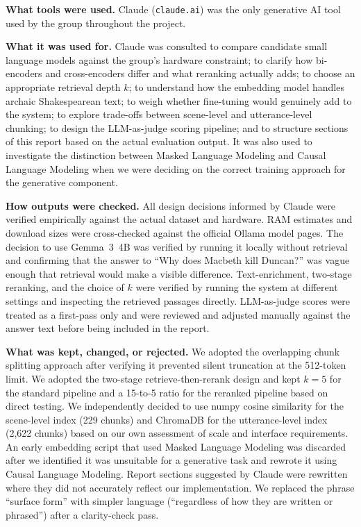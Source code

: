 \documentclass[10pt,conference]{IEEEtran}
\begin{document}
\textbf{What tools were used.} Claude (\texttt{claude.ai}) was the
only generative AI tool used by the group throughout the project.

\textbf{What it was used for.} Claude was consulted to compare
candidate small language models against the group's hardware
constraint; to clarify how bi-encoders and cross-encoders differ
and what reranking actually adds; to choose an appropriate
retrieval depth $k$; to understand how the embedding model handles
archaic Shakespearean text; to weigh whether fine-tuning would
genuinely add to the system; to explore trade-offs between
scene-level and utterance-level chunking; to design the
LLM-as-judge scoring pipeline; and to structure sections of this
report based on the actual evaluation output. It was also used to
investigate the distinction between Masked Language Modeling and
Causal Language Modeling when we were deciding on the correct
training approach for the generative component.

\textbf{How outputs were checked.} All design decisions informed by
Claude were verified empirically against the actual dataset and
hardware. RAM estimates and download sizes were cross-checked
against the official Ollama model pages. The decision to use
Gemma~3~4B was verified by running it locally without retrieval and
confirming that the answer to ``Why does Macbeth kill Duncan?'' was
vague enough that retrieval would make a visible difference.
Text-enrichment, two-stage reranking, and the choice of $k$ were
verified by running the system at different settings and inspecting
the retrieved passages directly. LLM-as-judge scores were treated
as a first-pass only and were reviewed and adjusted manually against
the answer text before being included in the report.

\textbf{What was kept, changed, or rejected.} We adopted the
overlapping chunk splitting approach after verifying it prevented
silent truncation at the 512-token limit. We adopted the two-stage
retrieve-then-rerank design and kept $k=5$ for the standard pipeline
and a 15-to-5 ratio for the reranked pipeline based on direct
testing. We independently decided to use numpy cosine similarity
for the scene-level index (229 chunks) and ChromaDB for the
utterance-level index (2{,}622 chunks) based on our own assessment
of scale and interface requirements. An early embedding script that
used Masked Language Modeling was discarded after we identified it
was unsuitable for a generative task and rewrote it using Causal
Language Modeling. Report sections suggested by Claude were
rewritten where they did not accurately reflect our implementation.
We replaced the phrase ``surface form'' with simpler language
(``regardless of how they are written or phrased'') after a
clarity-check pass.
\end{document}
